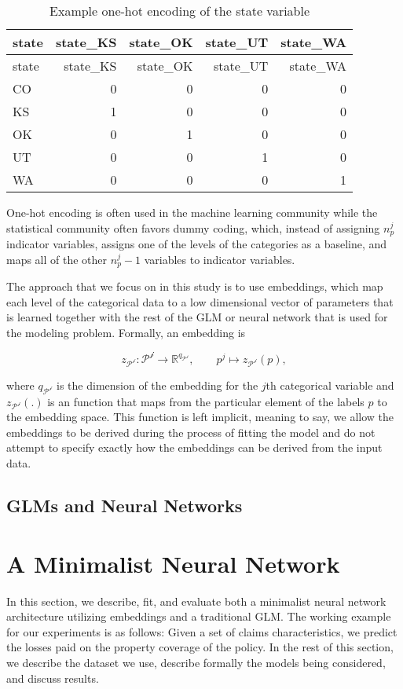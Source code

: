 \documentclass{article}
\begin{document}
\begin{longtable}[]{@{}lrrrr@{}}
\caption{Example one-hot encoding of the state variable}\tabularnewline
\toprule
state & state\_KS & state\_OK & state\_UT & state\_WA\tabularnewline
\midrule
\endfirsthead
\toprule
state & state\_KS & state\_OK & state\_UT & state\_WA\tabularnewline
\midrule
\endhead
CO & 0 & 0 & 0 & 0\tabularnewline
KS & 1 & 0 & 0 & 0\tabularnewline
OK & 0 & 1 & 0 & 0\tabularnewline
UT & 0 & 0 & 1 & 0\tabularnewline
WA & 0 & 0 & 0 & 1\tabularnewline
\bottomrule
\end{longtable}

One-hot encoding is often used in the machine learning community while
the statistical community often favors dummy coding, which, instead of
assigning \(n_p^j\) indicator variables, assigns one of the levels of
the categories as a baseline, and maps all of the other \(n_p^j -1\)
variables to indicator variables.

The approach that we focus on in this study is to use embeddings, which
map each level of the categorical data to a low dimensional vector of
parameters that is learned together with the rest of the GLM or neural
network that is used for the modeling problem. Formally, an embedding is

\[
z_\mathcal{P^j} : \mathcal{P^j} \to \mathbb{R}^{q_\mathcal{P^j} }, \quad \quad p^j \mapsto  z_\mathcal{P^j}(p),
\]

where \(q_\mathcal{P^j}\) is the dimension of the embedding for the
\(j\)th categorical variable and \(z_\mathcal{P^j}(.)\) is an function
that maps from the particular element of the labels \(p\) to the
embedding space. This function is left implicit, meaning to say, we
allow the embeddings to be derived during the process of fitting the
model and do not attempt to specify exactly how the embeddings can be
derived from the input data.

\hypertarget{glms-and-neural-networks}{%
\subsection{GLMs and Neural Networks}\label{glms-and-neural-networks}}

\hypertarget{modelling}{%
\section{A Minimalist Neural Network}\label{modelling}}

In this section, we describe, fit, and evaluate both a minimalist neural
network architecture utilizing embeddings and a traditional GLM. The
working example for our experiments is as follows: Given a set of claims
characteristics, we predict the losses paid on the property coverage of
the policy. In the rest of this section, we describe the dataset we use,
describe formally the models being considered, and discuss results.
\end{document}

